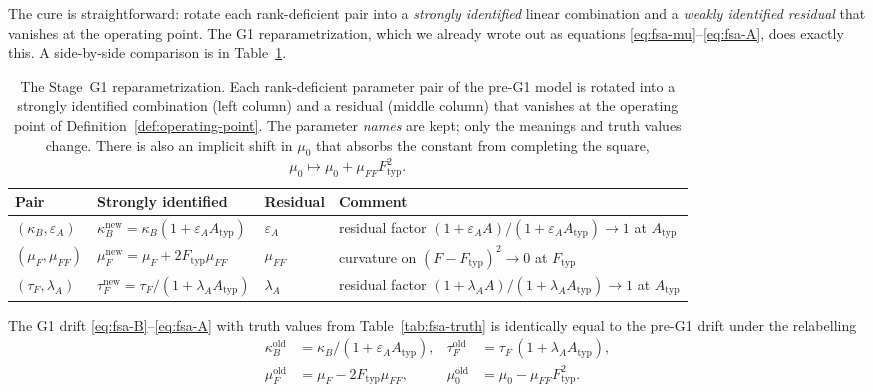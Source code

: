 The cure is straightforward: rotate each rank-deficient pair into a
\emph{strongly identified} linear combination and a
\emph{weakly identified residual} that vanishes at the operating
point. The G1 reparametrization, which we already wrote out as
equations \eqref{eq:fsa-mu}--\eqref{eq:fsa-A}, does exactly this. A
side-by-side comparison is in Table~\ref{tab:g1-reparam}.

\begin{table}[h]
\centering
\small
\begin{tabular}{@{}llll@{}}
\toprule
Pair & Strongly identified & Residual & Comment \\
\midrule
$(\kappa_B,\varepsilon_A)$  & $\kappa_B^{\mathrm{new}} = \kappa_B(1+\varepsilon_A A_{\mathrm{typ}})$
                             & $\varepsilon_A$  & residual factor $(1+\varepsilon_A A)/(1+\varepsilon_A A_{\mathrm{typ}}) \to 1$ at $A_{\mathrm{typ}}$ \\
$(\mu_F,\mu_{FF})$          & $\mu_F^{\mathrm{new}} = \mu_F + 2 F_{\mathrm{typ}} \mu_{FF}$
                             & $\mu_{FF}$       & curvature on $(F - F_{\mathrm{typ}})^2 \to 0$ at $F_{\mathrm{typ}}$ \\
$(\tau_F,\lambda_A)$        & $\tau_F^{\mathrm{new}} = \tau_F/(1+\lambda_A A_{\mathrm{typ}})$
                             & $\lambda_A$      & residual factor $(1+\lambda_A A)/(1+\lambda_A A_{\mathrm{typ}}) \to 1$ at $A_{\mathrm{typ}}$ \\
\bottomrule
\end{tabular}
\caption{The Stage~G1 reparametrization. Each rank-deficient parameter
pair of the pre-G1 model is rotated into a strongly identified
combination (left column) and a residual (middle column) that vanishes
at the operating point of Definition~\ref{def:operating-point}. The
parameter \emph{names} are kept; only the meanings and truth values
change. There is also an implicit shift in $\mu_0$ that absorbs the
constant from completing the square, $\mu_0 \mapsto \mu_0 + \mu_{FF}
F_{\mathrm{typ}}^2$.}
\label{tab:g1-reparam}
\end{table}

\begin{proposition}\label{prop:g1-equiv}
The G1 drift \eqref{eq:fsa-B}--\eqref{eq:fsa-A} with truth values from
Table~\ref{tab:fsa-truth} is identically equal to the pre-G1 drift
under the relabelling
\begin{align*}
  \kappa_B^{\mathrm{old}} &= \kappa_B/(1+\varepsilon_A A_{\mathrm{typ}}), &
  \tau_F^{\mathrm{old}}   &= \tau_F\,(1+\lambda_A A_{\mathrm{typ}}), \\
  \mu_F^{\mathrm{old}}    &= \mu_F - 2 F_{\mathrm{typ}} \mu_{FF}, &
  \mu_0^{\mathrm{old}}    &= \mu_0 - \mu_{FF} F_{\mathrm{typ}}^2.
\end{align*}
\end{proposition}

